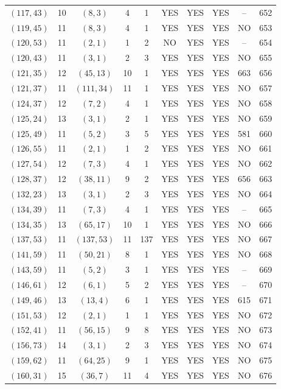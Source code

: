 \begin{longtable}{|c|c|c|c|c|c|c|c|c|c|}
$(117, 43)$ & 10 & $(8, 3)$ & 4 & 1 & YES & YES & YES & -- & 652\\
$(119, 45)$ & 11 & $(8, 3)$ & 4 & 1 & YES & YES & YES & NO & 653\\
$(120, 53)$ & 11 & $(2, 1)$ & 1 & 2 & NO & YES & YES & -- & 654\\
$(120, 43)$ & 11 & $(3, 1)$ & 2 & 3 & YES & YES & YES & NO & 655\\
$(121, 35)$ & 12 & $(45, 13)$ & 10 & 1 & YES & YES & YES & 663 & 656\\
$(121, 37)$ & 11 & $(111, 34)$ & 11 & 1 & YES & YES & YES & NO & 657\\
$(124, 37)$ & 12 & $(7, 2)$ & 4 & 1 & YES & YES & YES & NO & 658\\
$(125, 24)$ & 13 & $(3, 1)$ & 2 & 1 & YES & YES & YES & NO & 659\\
$(125, 49)$ & 11 & $(5, 2)$ & 3 & 5 & YES & YES & YES & 581 & 660\\
$(126, 55)$ & 11 & $(2, 1)$ & 1 & 2 & YES & YES & YES & NO & 661\\
$(127, 54)$ & 12 & $(7, 3)$ & 4 & 1 & YES & YES & YES & NO & 662\\
$(128, 37)$ & 12 & $(38, 11)$ & 9 & 2 & YES & YES & YES & 656 & 663\\
$(132, 23)$ & 13 & $(3, 1)$ & 2 & 3 & YES & YES & YES & NO & 664\\
$(134, 39)$ & 11 & $(7, 3)$ & 4 & 1 & YES & YES & YES & -- & 665\\
$(134, 35)$ & 13 & $(65, 17)$ & 10 & 1 & YES & YES & YES & NO & 666\\
$(137, 53)$ & 11 & $(137, 53)$ & 11 & 137 & YES & YES & YES & NO & 667\\
$(141, 59)$ & 11 & $(50, 21)$ & 8 & 1 & YES & YES & YES & NO & 668\\
$(143, 59)$ & 11 & $(5, 2)$ & 3 & 1 & YES & YES & YES & -- & 669\\
$(146, 61)$ & 12 & $(6, 1)$ & 5 & 2 & YES & YES & YES & -- & 670\\
$(149, 46)$ & 13 & $(13, 4)$ & 6 & 1 & YES & YES & YES & 615 & 671\\
$(151, 53)$ & 12 & $(2, 1)$ & 1 & 1 & YES & YES & YES & NO & 672\\
$(152, 41)$ & 11 & $(56, 15)$ & 9 & 8 & YES & YES & YES & NO & 673\\
$(156, 73)$ & 14 & $(3, 1)$ & 2 & 3 & YES & YES & YES & NO & 674\\
$(159, 62)$ & 11 & $(64, 25)$ & 9 & 1 & YES & YES & YES & NO & 675\\
$(160, 31)$ & 15 & $(36, 7)$ & 11 & 4 & YES & YES & YES & NO & 676\\

\end{longtable}
